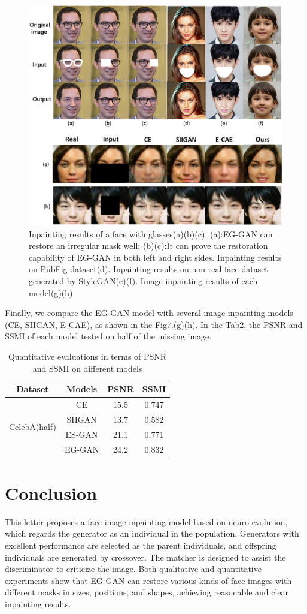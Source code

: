 \documentclass[journal]{IEEEtran}
\begin{document}
    \begin{figure}[htbp]
       \centering
       \includegraphics[width=0.7\linewidth]{figures/Fig7.png}
       \caption{Inpainting results of a face with glasses(a)(b)(c): (a):EG-GAN can restore an irregular mask well; (b)(c):It can prove the restoration capability of EG-GAN in both left and right sides. Inpainting results on PubFig dataset\cite{setty2013indian}(d). Inpainting results on non-real face dataset generated by StyleGAN\cite{karras2019style}(e)(f). Image inpainting results of each model(g)(h)}
       \label{fig:Fig7}
    \end{figure}

    Finally, we compare the EG-GAN model with several image inpainting models (CE, SIIGAN, E-CAE), as shown in the Fig7.(g)(h). In the Tab2, the PSNR and SSMI of each model tested on half of the missing image.
    \begin{table}[H]
    \caption{Quantitative evaluations in terms of PSNR and SSMI on different models}
	\centering
        \renewcommand{\arraystretch}{1.25}
        \begin{tabular}{|c|c|c|c|}
        \hline
        Dataset&Models&PSNR&SSMI\\
        \hline
        \multirow{4}{*}{CelebA(half)}&CE&15.5&0.747\\
        \cline{2-4}
        &SIIGAN&13.7&0.582\\
        \cline{2-4}
        &ES-GAN&21.1&0.771\\
        \cline{2-4}
        &EG-GAN&24.2&0.832\\
        \hline
        \end{tabular}
    \end{table}

\section{Conclusion}
This letter proposes a face image inpainting model based on neuro-evolution, which regards the generator as an individual in the population. Generators with excellent performance are selected as the parent individuals, and offspring individuals are generated by crossover. The matcher is designed to assist the discriminator to criticize the image. Both qualitative and quantitative experiments show that EG-GAN can restore various kinds of face images with different masks in sizes, positions, and shapes, achieving reasonable and clear inpainting results.
    



\end{document}

